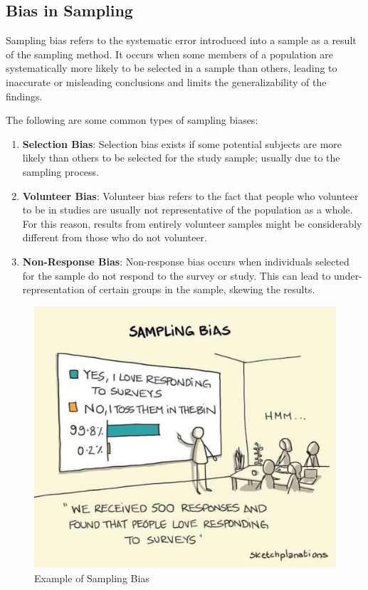 \documentclass{article}
\begin{document}
        \subsection{Bias in Sampling}

        Sampling bias refers to the systematic error introduced into a sample as a result of the sampling method. It occurs when some members of a population are systematically more likely to be selected in a sample than others, leading to inaccurate or misleading conclusions and limits the generalizability of the findings. \cite{statistics_nutshell} \cite{scribbr_bias}

        \noindent The following are some common types of sampling biases:

        \begin{enumerate}
            \item \textbf{Selection Bias}: Selection bias exists if some potential subjects are more likely than others to be selected for the study sample; usually due to the sampling process.

            \item \textbf{Volunteer Bias}: Volunteer bias refers to the fact that people who volunteer to be in studies are usually not representative of the population as a whole. For this reason, results from entirely volunteer samples might be considerably different from those who do not volunteer.

            \item \textbf{Non-Response Bias}: Non-response bias occurs when individuals selected for the sample do not respond to the survey or study. This can lead to under-representation of certain groups in the sample, skewing the results.
        \end{enumerate}
        \begin{figure}[htbp]
		      \centering
		      \includegraphics[scale = 0.25]{../images/sampling_bias_meme.jpeg}
		      \caption{Example of Sampling Bias}
		      \label{Sampling_Bias}
	    \end{figure}
\end{document}
